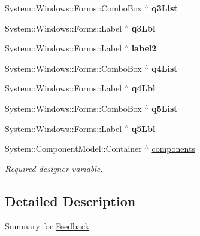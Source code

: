 \begin{DoxyCompactItemize}
\mbox{\label{class_gaze_track_g_u_i_1_1_feedback_a59f211443a85e0a10345fe3fc4685880}} 
System\+::\+Windows\+::\+Forms\+::\+Combo\+Box $^\wedge$ {\bfseries q3\+List}
\item 
\mbox{\label{class_gaze_track_g_u_i_1_1_feedback_a319367eb4b5261efe2c621e4b1fff2f3}} 
System\+::\+Windows\+::\+Forms\+::\+Label $^\wedge$ {\bfseries q3\+Lbl}
\item 
\mbox{\label{class_gaze_track_g_u_i_1_1_feedback_a46bce8a7a95f4f1169662c889e36098f}} 
System\+::\+Windows\+::\+Forms\+::\+Label $^\wedge$ {\bfseries label2}
\item 
\mbox{\label{class_gaze_track_g_u_i_1_1_feedback_a31c12024aa7ddda4182aed5fce031e06}} 
System\+::\+Windows\+::\+Forms\+::\+Combo\+Box $^\wedge$ {\bfseries q4\+List}
\item 
\mbox{\label{class_gaze_track_g_u_i_1_1_feedback_a02a8f63e8968888c3c805d41500f205b}} 
System\+::\+Windows\+::\+Forms\+::\+Label $^\wedge$ {\bfseries q4\+Lbl}
\item 
\mbox{\label{class_gaze_track_g_u_i_1_1_feedback_a21577db6aa9dbef15a90c8ef3c1c87b7}} 
System\+::\+Windows\+::\+Forms\+::\+Combo\+Box $^\wedge$ {\bfseries q5\+List}
\item 
\mbox{\label{class_gaze_track_g_u_i_1_1_feedback_a5199443ff35a81547d9fe949fff387d6}} 
System\+::\+Windows\+::\+Forms\+::\+Label $^\wedge$ {\bfseries q5\+Lbl}
\item 
System\+::\+Component\+Model\+::\+Container $^\wedge$ \mbox{\hyperlink{class_gaze_track_g_u_i_1_1_feedback_a26e51fa73149737460c9a20e9be9dfe2}{components}}
\begin{DoxyCompactList}\small\item\em Required designer variable. \end{DoxyCompactList}\end{DoxyCompactItemize}


\subsection{Detailed Description}
Summary for \mbox{\hyperlink{class_gaze_track_g_u_i_1_1_feedback}{Feedback}} 



